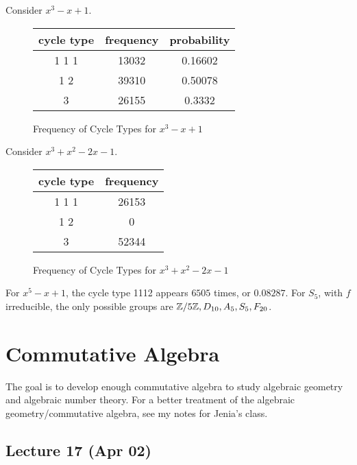 \documentclass[10pt, twoside]{article}
\begin{document}
        \begin{exm} Consider $x^3-x+1$.  \begin{figure}[H] \begin{center}
            \begin{tabular}{ccc} \toprule cycle type & frequency & probability
                \\ \midrule 1 1 1 & 13032 & 0.16602 \\ 1 2 & 39310 & 0.50078 \\
                3 & 26155 & 0.3332 \\ \bottomrule \end{tabular} \end{center}
                \caption{Frequency of Cycle Types for $x^3-x+1$} \end{figure}
                \end{exm} \begin{exm} Consider $x^3+x^2 -2x-1$.
                \begin{figure}[H] \begin{center} \begin{tabular}{cc} \toprule
                cycle type & frequency  \\ \midrule 1 1 1 & 26153  \\ 1 2 & 0
            \\ 3 & 52344  \\ \bottomrule \end{tabular} \end{center}
            \caption{Frequency of Cycle Types for $x^3+x^2-2x-1$} \end{figure}
        \end{exm}

        \begin{exm} For $x^5-x+1$, the cycle type 1112 appears $6505$ times, or
        $0.08287$. For $S_5$, with $f$ irreducible, the only possible groups
    are $\mathbb{Z}/5\mathbb{Z}, D_{10}, A_5, S_5, F_{20}$.  \end{exm}

        \section{Commutative Algebra} The goal is to develop enough commutative
        algebra to study algebraic geometry and algebraic number theory. For a
        better treatment of the algebraic geometry/commutative algebra, see my
        notes for Jenia's class.

        \subsection{Lecture 17 (Apr 02)}
\end{document}

